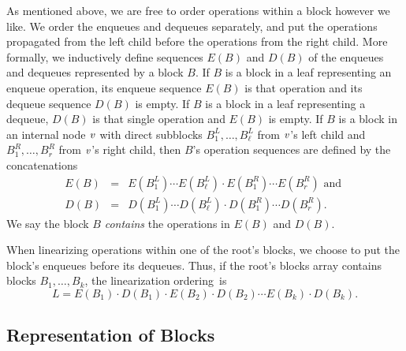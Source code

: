 As mentioned above, we are free to order operations within a block however we like.
We order the enqueues and dequeues separately, and put the 
operations propagated from the left child before the operations from the right child.
More formally, we inductively define sequences $E(B)$ and $D(B)$ of the enqueues and dequeues
represented by a block $B$.
If $B$ is a block in a leaf representing an enqueue operation, its enqueue sequence $E(B)$ is that operation
and its dequeue sequence $D(B)$ is empty.  If $B$ is a block in a leaf representing a dequeue, $D(B)$ is that single operation and $E(B)$ is empty.
If $B$ is a block in an internal node $\mbox{\textnormal{\textit{v}}}$ with direct subblocks $B^L_1, \ldots, B^L_\ell$ from 
$\mbox{\textnormal{\textit{v}}}$'s left child
and $B^R_1,\ldots,B^R_r$ from $\mbox{\textnormal{\textit{v}}}$'s right child, then $B$'s operation sequences are defined by the concatenations 
\begin{eqnarray}
E(B) &=& E(B^L_1)\cdots E(B^L_\ell)\cdot E(B^R_1) \cdots E(B^R_r) \mbox{ and }\nonumber\\
D(B) &=& D(B^L_1)\cdots D(B^L_\ell)\cdot D(B^R_1) \cdots D(B^R_r).
\label{defSeqs}
\end{eqnarray}
We say the block $B$ \emph{contains} the operations in $E(B)$ and $D(B)$.

When linearizing operations within one of the root's blocks, we choose
to put the block's enqueues before its dequeues.
Thus, if the root's blocks array contains blocks $B_1, \ldots, B_k$, the 
linearization ordering~is 
\begin{equation}
L=E(B_1)\cdot D(B_1) \cdot E(B_2) \cdot D(B_2) \cdots E(B_k) \cdot D(B_k).\label{linearization}
\end{equation}

\subsection{Representation of Blocks}
\label{sec:fields}

